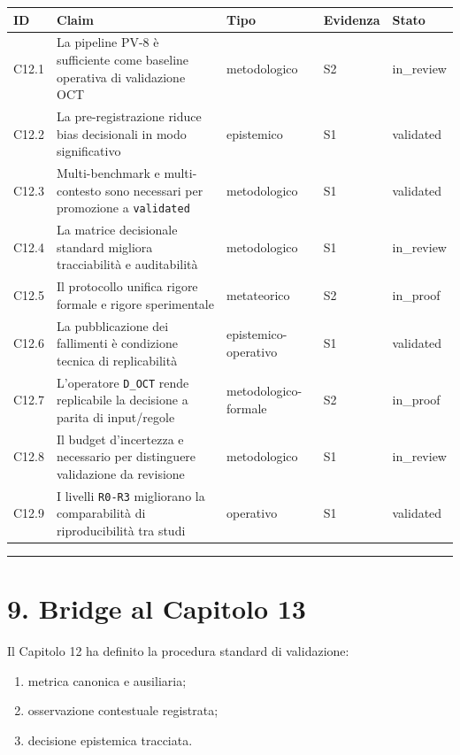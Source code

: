 {\def\LTcaptype{none} %
\begin{longtable}[]{@{}lllll@{}}
\toprule\noalign{}
ID & Claim & Tipo & Evidenza & Stato \\
\midrule\noalign{}
\endhead
\bottomrule\noalign{}
\endlastfoot
C12.1 & La pipeline PV-8 è sufficiente come baseline operativa di validazione OCT & metodologico & S2 & in\_review \\
C12.2 & La pre-registrazione riduce bias decisionali in modo significativo & epistemico & S1 & validated \\
C12.3 & Multi-benchmark e multi-contesto sono necessari per promozione a \texttt{validated} & metodologico & S1 & validated \\
C12.4 & La matrice decisionale standard migliora tracciabilità e auditabilità & metodologico & S1 & in\_review \\
C12.5 & Il protocollo unifica rigore formale e rigore sperimentale & metateorico & S2 & in\_proof \\
C12.6 & La pubblicazione dei fallimenti è condizione tecnica di replicabilità & epistemico-operativo & S1 & validated \\
C12.7 & L'operatore \texttt{D\_OCT} rende replicabile la decisione a parita di input/regole & metodologico-formale & S2 & in\_proof \\
C12.8 & Il budget d'incertezza e necessario per distinguere validazione da revisione & metodologico & S1 & in\_review \\
C12.9 & I livelli \texttt{R0-R3} migliorano la comparabilità di riproducibilità tra studi & operativo & S1 & validated \\
\end{longtable}
}

\begin{center}\rule{0.5\linewidth}{0.5pt}\end{center}

\section{9. Bridge al Capitolo 13}

Il Capitolo 12 ha definito la procedura standard di validazione:

\begin{enumerate}
\def\labelenumi{\arabic{enumi}.}
\tightlist
\item
  metrica canonica e ausiliaria;
\item
  osservazione contestuale registrata;
\item
  decisione epistemica tracciata.
\end{enumerate}

